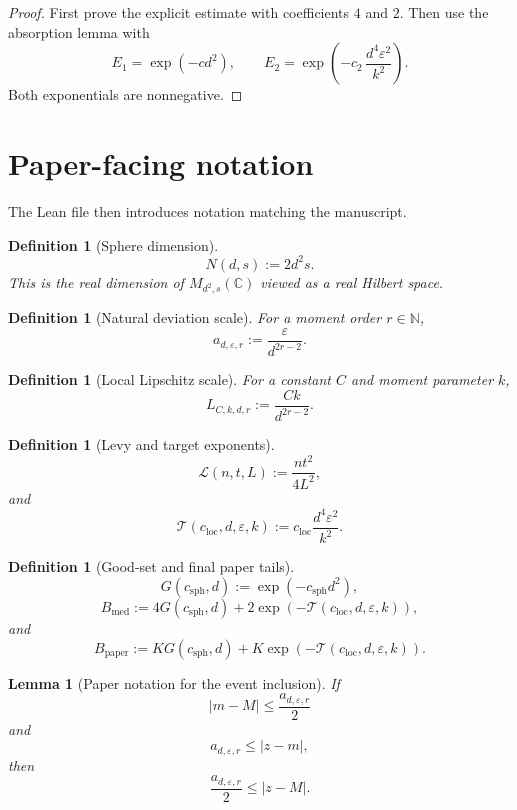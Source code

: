 \documentclass[11pt]{article}
\newtheorem{lemma}[theorem]{Lemma}
\newtheorem{definition}[theorem]{Definition}
\begin{document}
\begin{proof}
First prove the explicit estimate with coefficients \(4\) and \(2\).  Then
use the absorption lemma with
\[
 E_1=\exp(-c d^2),
 \qquad
 E_2=\exp\!\left(-c_2\,\frac{d^4\varepsilon^2}{k^2}\right).
\]
Both exponentials are nonnegative.
\end{proof}

\section{Paper-facing notation}

The Lean file then introduces notation matching the manuscript.

\begin{definition}[Sphere dimension]
\[
  N(d,s):=2d^2s.
\]
This is the real dimension of \(M_{d^2,s}(\mathbb C)\) viewed as a real
Hilbert space.
\end{definition}

\begin{definition}[Natural deviation scale]
For a moment order \(r\in\mathbb N\),
\[
  a_{d,\varepsilon,r}
  :=
  \frac{\varepsilon}{d^{2r-2}}.
\]
\end{definition}

\begin{definition}[Local Lipschitz scale]
For a constant \(C\) and moment parameter \(k\),
\[
  L_{C,k,d,r}
  :=
  \frac{Ck}{d^{2r-2}}.
\]
\end{definition}

\begin{definition}[Levy and target exponents]
\[
  \mathcal L(n,t,L):=\frac{nt^2}{4L^2},
\]
and
\[
  \mathcal T(c_{\mathrm{loc}},d,\varepsilon,k)
  :=
  c_{\mathrm{loc}}\frac{d^4\varepsilon^2}{k^2}.
\]
\end{definition}

\begin{definition}[Good-set and final paper tails]
\[
  G(c_{\mathrm{sph}},d):=\exp(-c_{\mathrm{sph}}d^2),
\]
\[
  B_{\mathrm{med}}
  :=
  4G(c_{\mathrm{sph}},d)
  +2\exp(-\mathcal T(c_{\mathrm{loc}},d,\varepsilon,k)),
\]
and
\[
  B_{\mathrm{paper}}
  :=
  K G(c_{\mathrm{sph}},d)
  +K\exp(-\mathcal T(c_{\mathrm{loc}},d,\varepsilon,k)).
\]
\end{definition}

\begin{lemma}[Paper notation for the event inclusion]
If
\[
 |m-M|\le \frac{a_{d,\varepsilon,r}}{2}
\]
and
\[
 a_{d,\varepsilon,r}\le |z-m|,
\]
then
\[
 \frac{a_{d,\varepsilon,r}}{2}\le |z-M|.
\]
\end{lemma}
\end{document}

